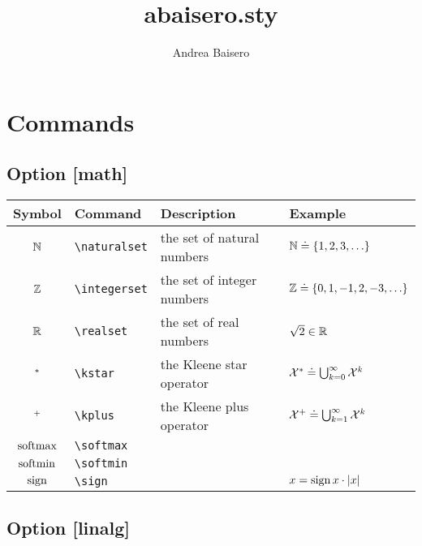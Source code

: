 \documentclass{article}
\begin{document}
\title{abaisero.sty}
\author{Andrea Baisero}

\newcommand\command[1]{\texttt{\textbackslash{#1}}}

\maketitle

\section{Commands}

\subsection*{Option [math]}

\begin{tabular}{clll}
  \toprule
  Symbol & Command & Description & Example \\
  \midrule
  $\mathbb{N}$ & \command{naturalset} & the set of natural numbers & $\mathbb{N} \doteq \{ 1, 2, 3, \ldots \}$ \\
  $\mathbb{Z}$ & \command{integerset} & the set of integer numbers & $\mathbb{Z} \doteq \{ 0, 1, -1, 2, -3, \ldots \}$ \\
  $\mathbb{R}$ & \command{realset} & the set of real numbers & $\sqrt{2} \in \mathbb{R}$ \\
  $^{*}$ & \command{kstar} & the Kleene star operator & $\mathcal{X}^{*} \doteq \bigcup_{k=0}^\infty \mathcal{X}^k$ \\
  $^{+}$ & \command{kplus} & the Kleene plus operator & $\mathcal{X}^{+} \doteq \bigcup_{k=1}^\infty \mathcal{X}^k$ \\
  $\operatorname*{softmax}$ & \command{softmax} & & \\
  $\operatorname*{softmin}$ & \command{softmin} & & \\
  $\operatorname{sign}$ & \command{sign} & & $x = \operatorname{sign}{x} \cdot |x|$ \\
  \bottomrule
\end{tabular}

\subsection*{Option [linalg]}
\end{document}
